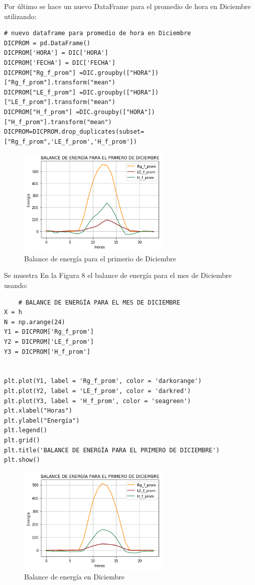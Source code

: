\documentclass[11pt, spanish]{report}
\begin{document}
Por último se hace un nuevo DataFrame para el promedio de hora en Diciembre utilizando:
\begin{verbatim}
# nuevo dataframe para promedio de hora en Diciembre
DICPROM = pd.DataFrame()
DICPROM['HORA'] = DIC['HORA']
DICPROM['FECHA'] = DIC['FECHA']
DICPROM["Rg_f_prom"] =DIC.groupby(["HORA"])["Rg_f_prom"].transform("mean")
DICPROM["LE_f_prom"] =DIC.groupby(["HORA"])["LE_f_prom"].transform("mean")
DICPROM["H_f_prom"] =DIC.groupby(["HORA"])["H_f_prom"].transform("mean")
DICPROM=DICPROM.drop_duplicates(subset=["Rg_f_prom",'LE_f_prom','H_f_prom'])

\end{verbatim}
\begin{figure}[ht]
\caption{Balance de energía para el primerio de Diciembre}
\centering
\includegraphics[width=0.65\textwidth]{figura7.png}
\end{figure}
Se muestra En la Figura 8 el balance de energía para el mes de Diciembre usando:
\begin{verbatim}
    # BALANCE DE ENERGÍA PARA EL MES DE DICIEMBRE
X = h                 
N = np.arange(24)         
Y1 = DICPROM['Rg_f_prom']     
Y2 = DICPROM['LE_f_prom']     
Y3 = DICPROM['H_f_prom']      


plt.plot(Y1, label = 'Rg_f_prom', color = 'darkorange')   
plt.plot(Y2, label = 'LE_f_prom', color = 'darkred')   
plt.plot(Y3, label = 'H_f_prom', color = 'seagreen')   
plt.xlabel("Horas")   
plt.ylabel("Energía")  
plt.legend()
plt.grid()
plt.title('BALANCE DE ENERGÍA PARA EL PRIMERO DE DICIEMBRE')
plt.show()
\end{verbatim}

\begin{figure}[ht]
\caption{Balance de energía en Diciembre}
\centering
\includegraphics[width=0.65\textwidth]{figura8.png}
\end{figure}
\end{document}
